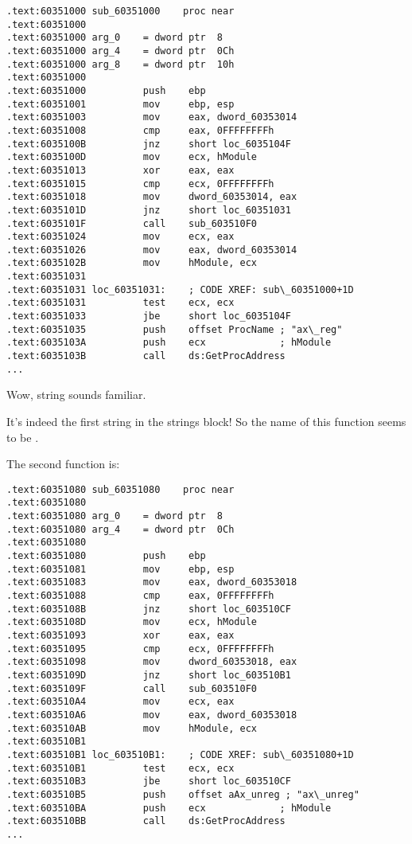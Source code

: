 \begin{lstlisting}[style=customasmx86]
.text:60351000 sub_60351000    proc near
.text:60351000
.text:60351000 arg_0    = dword ptr  8
.text:60351000 arg_4    = dword ptr  0Ch
.text:60351000 arg_8    = dword ptr  10h
.text:60351000
.text:60351000          push    ebp
.text:60351001          mov     ebp, esp
.text:60351003          mov     eax, dword_60353014
.text:60351008          cmp     eax, 0FFFFFFFFh
.text:6035100B          jnz     short loc_6035104F
.text:6035100D          mov     ecx, hModule
.text:60351013          xor     eax, eax
.text:60351015          cmp     ecx, 0FFFFFFFFh
.text:60351018          mov     dword_60353014, eax
.text:6035101D          jnz     short loc_60351031
.text:6035101F          call    sub_603510F0
.text:60351024          mov     ecx, eax
.text:60351026          mov     eax, dword_60353014
.text:6035102B          mov     hModule, ecx
.text:60351031
.text:60351031 loc_60351031:    ; CODE XREF: sub\_60351000+1D
.text:60351031          test    ecx, ecx
.text:60351033          jbe     short loc_6035104F
.text:60351035          push    offset ProcName ; "ax\_reg"
.text:6035103A          push    ecx             ; hModule
.text:6035103B          call    ds:GetProcAddress
...
\end{lstlisting}

Wow,  string sounds familiar. 

It's indeed the first string in the strings block!
So the name of this function seems to be .

The second function is:

\begin{lstlisting}[style=customasmx86]
.text:60351080 sub_60351080    proc near
.text:60351080
.text:60351080 arg_0    = dword ptr  8
.text:60351080 arg_4    = dword ptr  0Ch
.text:60351080
.text:60351080          push    ebp
.text:60351081          mov     ebp, esp
.text:60351083          mov     eax, dword_60353018
.text:60351088          cmp     eax, 0FFFFFFFFh
.text:6035108B          jnz     short loc_603510CF
.text:6035108D          mov     ecx, hModule
.text:60351093          xor     eax, eax
.text:60351095          cmp     ecx, 0FFFFFFFFh
.text:60351098          mov     dword_60353018, eax
.text:6035109D          jnz     short loc_603510B1
.text:6035109F          call    sub_603510F0
.text:603510A4          mov     ecx, eax
.text:603510A6          mov     eax, dword_60353018
.text:603510AB          mov     hModule, ecx
.text:603510B1
.text:603510B1 loc_603510B1:    ; CODE XREF: sub\_60351080+1D
.text:603510B1          test    ecx, ecx
.text:603510B3          jbe     short loc_603510CF
.text:603510B5          push    offset aAx_unreg ; "ax\_unreg"
.text:603510BA          push    ecx             ; hModule
.text:603510BB          call    ds:GetProcAddress
...
\end{lstlisting}

